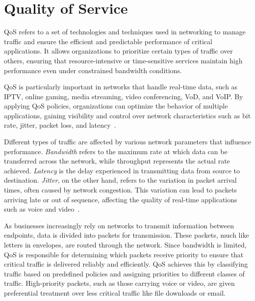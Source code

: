 \section{Quality of Service}

\ac{QoS} refers to a set of technologies and techniques used in networking to manage traffic and ensure the efficient and predictable performance of critical applications. It allows organizations to prioritize certain types of traffic over others, ensuring that resource-intensive or time-sensitive services maintain high performance even under constrained bandwidth conditions.

QoS is particularly important in networks that handle real-time data, such as \ac{IPTV}, online gaming, media streaming, video conferencing, \ac{VoD}, and \ac{VoIP}. By applying QoS policies, organizations can optimize the behavior of multiple applications, gaining visibility and control over network characteristics such as bit rate, jitter, packet loss, and latency~\cite{rhim_what_2024, hpe_juniper_networking_what_nodate, paloalto_networks_what_nodate, fortinet_what_nodate}.


Different types of traffic are affected by various network parameters that influence performance. \textit{Bandwidth} refers to the maximum rate at which data can be transferred across the network, while throughput represents the actual rate achieved. \textit{Latency} is the delay experienced in transmitting data from source to destination. \textit{Jitter}, on the other hand, refers to the variation in packet arrival times, often caused by network congestion. This variation can lead to packets arriving late or out of sequence, affecting the quality of real-time applications such as voice and video~\cite{paloalto_networks_what_nodate, fortinet_what_nodate}.


As businesses increasingly rely on networks to transmit information between endpoints, data is divided into packets for transmission. These packets, much like letters in envelopes, are routed through the network. Since bandwidth is limited, QoS is responsible for determining which packets receive priority to ensure that critical traffic is delivered reliably and efficiently. QoS achieves this by classifying traffic based on predefined policies and assigning priorities to different classes of traffic. High-priority packets, such as those carrying voice or video, are given preferential treatment over less critical traffic like file downloads or email.


